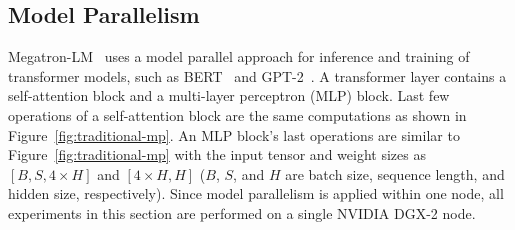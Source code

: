 \subsection{Model Parallelism}
Megatron-LM~\cite{megatronlm} uses a model parallel approach for inference and training of transformer models, such as BERT~\cite{bert} and GPT-2~\cite{gpt-2}. 
A transformer layer contains a self-attention block and a 
multi-layer perceptron (MLP) block. Last few operations of a self-attention block are the same 
computations as shown in Figure~\ref{fig:traditional-mp}. An MLP block's last operations are similar to 
Figure~\ref{fig:traditional-mp} with the input tensor and weight sizes as $[B, S, 4 \times H]$ and $[4 \times H, H]$ ($B$, $S$, and $H$ are batch size, sequence length, and hidden size, respectively).
Since model parallelism is applied within one node, all experiments in this section are performed on a single NVIDIA DGX-2 node.

